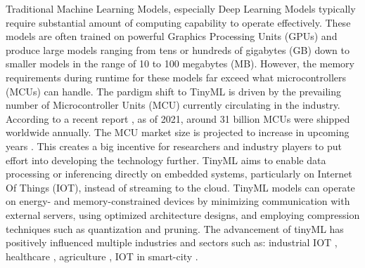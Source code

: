 \documentclass[twocolumn]{article}
\begin{document}
Traditional Machine Learning Models, especially Deep Learning Models typically require substantial amount of computing capability to operate effectively. These models are often trained on powerful Graphics Processing Units (GPUs) and produce large models ranging from tens or hundreds of gigabytes (GB) down to smaller models in the range of 10 to 100 megabytes (MB). However, the memory requirements during runtime for these models far exceed what microcontrollers (MCUs) can handle.
The pardigm shift to TinyML is driven by the prevailing number of Microcontroller Units (MCU) currently circulating in the industry. According to a recent report \cite{noauthor_microcontroller_nodate,grandviewresearch_research_2023}, as of 2021, around 31 billion MCUs were shipped worldwide annually. The MCU market size is projected to increase in upcoming years \cite{noauthor_microcontroller_nodate}. This creates a big incentive for researchers and industry players to put effort into developing the technology further.
TinyML aims to enable data processing or inferencing directly on embedded systems, particularly on Internet Of Things (IOT), instead of streaming to the cloud. TinyML models can operate on energy- and memory-constrained devices by minimizing communication with external servers, using optimized architecture designs, and employing compression techniques such as quantization and pruning. The advancement of tinyML has positively influenced multiple industries and sectors such as: industrial IOT \cite{ray_review_2022}, healthcare \cite{bhamare_chapter_2024}, agriculture \cite{tsoukas_tinyml-based_2022}, IOT in smart-city \cite{hussein_original_2024,ray_review_2022}. \\[0.25cm]
\end{document}
